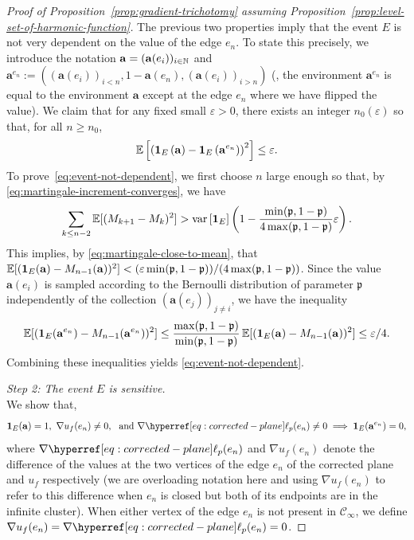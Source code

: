 \documentclass[12pt]{amsart}
\numberwithin{equation}{section}
\begin{document}
\begin{proof}[Proof of Proposition~\ref{prop:gradient-trichotomy} assuming Proposition~\ref{prop:level-set-of-harmonic-function}]
		The previous two properties imply that the event $E$ is not very dependent on the value of the edge $e_n$. To state this precisely, we introduce the notation $\mathbf{a} = (\mathbf{a}(e_i))_{i\in \operatorname{\mathbb{N}}}$ and $\mathbf{a}^{e_n} := ((\mathbf{a}(e_i))_{i < n} , 1- \mathbf{a}(e_n), (\mathbf{a}(e_i))_{i > n})$ (\ie, the environment $\mathbf{a}^{e_n}$ is equal to the environment $\mathbf{a}$ except at the edge $e_n$ where we have flipped the value). 
		We claim that for any fixed small $\varepsilon > 0$, there exists an integer $n_0(\varepsilon)$ so that, for all $n \geq n_0$,
		\begin{equation} \label{eq:event-not-dependent}
			\operatorname{\mathop{\mathbb E{}}} \left[ \left( {\boldsymbol{1}}_{E} \left( \mathbf{a} \right) -  {\boldsymbol{1}}_{E} \left( \mathbf{a}^{e_n} \right) \right)^2\right] \leq \varepsilon.
		\end{equation}
		To prove~\eqref{eq:event-not-dependent}, we first choose $n$ large enough so that, by \eqref{eq:martingale-increment-converges}, we have
		\begin{equation*}
			\sum_{k \leq n-2} \operatorname{\mathop{\mathbb E{}}}[(M_{k+1}-M_k)^2] > \mathrm{var} \left[ {\boldsymbol{1}}_{E} \right] \left(1- \frac{\min(\mathfrak{p} , 1 - \mathfrak{p})}{ 4 \max(\mathfrak{p} , 1 - \mathfrak{p})} \varepsilon \right).
		\end{equation*} 
		This implies, by \eqref{eq:martingale-close-to-mean}, that $\operatorname{\mathop{\mathbb E{}}}[({\boldsymbol{1}}_E(\mathbf{a})-M_{n-1}(\mathbf{a}))^2] < (\varepsilon \min(\mathfrak{p} , 1 - \mathfrak{p}))/(4 \max(\mathfrak{p} , 1 - \mathfrak{p}))$. Since the value $\mathbf{a}(e_i)$ is sampled according to the Bernoulli distribution of parameter $\mathfrak{p}$ independently of the collection $(\mathbf{a}(e_j))_{j \neq i}$, we have the inequality
		\begin{equation*}
			\operatorname{\mathop{\mathbb E{}}}[({\boldsymbol{1}}_E(\mathbf{a}^{e_n})-M_{n-1}(\mathbf{a}^{e_n}))^2] \leq \frac{\max(\mathfrak{p} , 1 - \mathfrak{p})}{ \min(\mathfrak{p} , 1 - \mathfrak{p})} \operatorname{\mathop{\mathbb E{}}}[({\boldsymbol{1}}_E(\mathbf{a})-M_{n-1}(\mathbf{a}))^2] \leq \varepsilon/4.
		\end{equation*}
		Combining these inequalities yields \eqref{eq:event-not-dependent}.
		\medskip
		
		{\it Step 2: The event $E$ is sensitive.} \\
		We show that,
		\begin{equation}  \label{eq:flip-edge-implication}
			\indc_{E}(\mathbf{a}) = 1,~ \nabla u_f(e_n) \neq 0, ~\mbox{ and}~  \nabla \ellp{p}(e_n) \neq 0 \implies \indc_{E}(\mathbf{a}^{e_n}) = 0,
		\end{equation}
		where $\nabla \ellp{p}(e_n)$ and $\nabla u_f(e_n)$ denote the difference of the values at the two vertices of the edge $e_n$
		of the corrected plane and $u_f$ respectively (we are overloading notation here and using $\nabla u_f(e_n)$ to refer to this difference when $e_n$ is closed but both of its endpoints are in the infinite cluster). 
		When either vertex of the edge $e_n$ is not present in $\mathscr{C}_{\infty}$, we define $\nabla u_f(e_n) = \nabla \ellp{p}(e_n) = 0$.
		

\end{proof}
\end{document}
